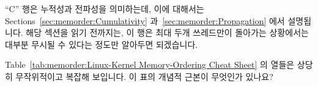 ``C'' 행은 누적성과 전파성을 의미하는데, 이에 대해서는
Sections~\ref{sec:memorder:Cumulativity}
과~\ref{sec:memorder:Propagation} 에서 설명됩니다.
해당 섹션을 읽기 전까지는, 이 행은 최대 두개 쓰레드만이 돌아가는 상황에서는
대부분 무시될 수 있다는 정도만 알아두면 되겠습니다.

\QuickQuiz{}
	Table~\ref{tab:memorder:Linux-Kernel Memory-Ordering Cheat Sheet}
	의 열들은 상당히 무작위적이고 복잡해 보입니다.
	이 표의 개념적 근본이 무엇인가 있나요?

